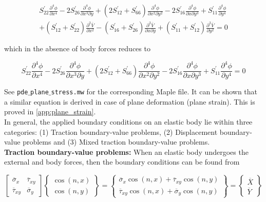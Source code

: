 \documentclass{article}
\begin{document}
\begin{multline}
    S^{'}_{22} \frac{\partial^4 \phi}{\partial x^4} - 2 S^{'}_{26} \frac{\partial^4 \phi}{\partial x^3 \partial y} + (2 S^{'}_{12} + S^{'}_{66}) \frac{\partial^4 \phi}{\partial x^2 \partial y^2} - 2 S^{'}_{16} \frac{\partial^4 \phi}{\partial x \partial y^3} + S^{'}_{11} \frac{\partial^4 \phi}{\partial y^4} \\ + (S^{'}_{12} + S^{'}_{22}) \frac{\partial^2 \overline{V}}{\partial x^2} - (S^{'}_{16} + S^{'}_{26}) \frac{\partial^2 \overline{V}}{\partial x \partial y}  + (S^{'}_{11} + S^{'}_{12}) \frac{\partial^2 \overline{V}}{\partial y^2} = 0
    \label{eq:pde_body_included}
\end{multline}

which in the absence of body forces reduces to

\begin{equation}
    S^{'}_{22} \frac{\partial^4 \phi}{\partial x^4} - 2 S^{'}_{26} \frac{\partial^4 \phi}{\partial x^3 \partial y} + (2 S^{'}_{12} + S^{'}_{66}) \frac{\partial^4 \phi}{\partial x^2 \partial y^2} - 2 S^{'}_{16} \frac{\partial^4 \phi}{\partial x \partial y^3} + S^{'}_{11} \frac{\partial^4 \phi}{\partial y^4} = 0
    \label{eq:pde_body_excluded}
\end{equation}

See \texttt{pde$\_$plane$\_$stress.mw} for the corresponding Maple file. It can be shown that a similar equation is derived in case of plane deformation (plane strain). This is proved in \cref{app:plane_strain}. \\

In general, the applied boundary conditions on an elastic body lie within three categories: (1) Traction boundary-value problems, (2) Displacement boundary-value problems and (3) Mixed traction boundary-value problems.  \\

\textbf{Traction boundary-value problems:} When an elastic body undergoes the external and body forces, then the boundary conditions can be found from

\begin{equation}
    \begin{bmatrix}
    \overline{\sigma}_x & \overline{\tau}_{xy}\\ 
    \overline{\tau}_{xy} & \overline{\sigma}_y
    \end{bmatrix} 
    \begin{Bmatrix}
    \cos(n, x) \\ 
    \cos(n, y)
    \end{Bmatrix} = 
    \begin{Bmatrix}
    \overline{\sigma}_x \cos(n, x) + \overline{\tau}_{xy} \cos(n, y) \\ 
    \overline{\tau}_{xy} \cos(n, x) + \overline{\sigma}_y \cos(n, y)
    \end{Bmatrix} = 
    \begin{Bmatrix}
    \overline{X} \\ 
    \overline{Y}
    \end{Bmatrix}
    \label{eq:average_traction}
\end{equation}
\end{document}
